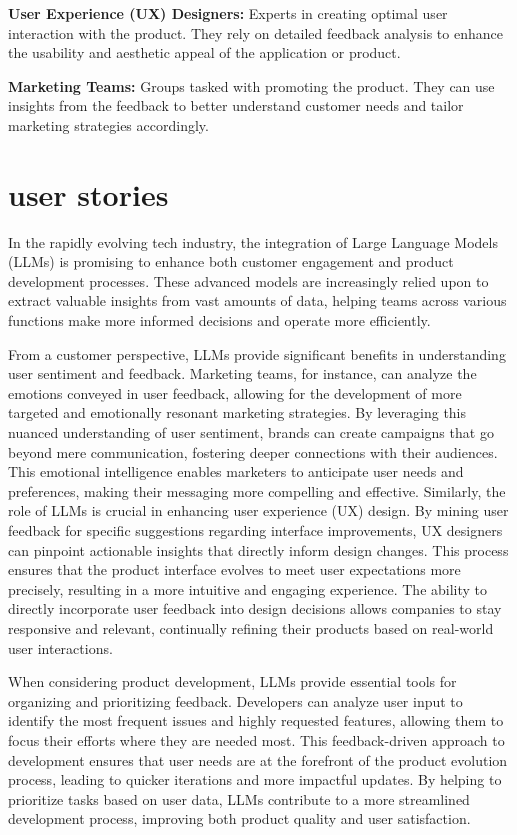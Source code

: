 \documentclass[journal,transmag]{IEEEtran}
\begin{document}
\textbf{User Experience (UX) Designers:} Experts in creating optimal user interaction with the product. They rely on detailed feedback analysis to enhance the usability and aesthetic appeal of the application or product.

\textbf{Marketing Teams:} Groups tasked with promoting the product. They can use insights from the feedback to better understand customer needs and tailor marketing strategies accordingly.



\section{user stories}
In the rapidly evolving tech industry, the integration of Large Language Models (LLMs) is promising to enhance both customer engagement and product development processes. These advanced models are increasingly relied upon to extract valuable insights from vast amounts of data, helping teams across various functions make more informed decisions and operate more efficiently.

From a customer perspective, LLMs provide significant benefits in understanding user sentiment and feedback. Marketing teams, for instance, can analyze the emotions conveyed in user feedback, allowing for the development of more targeted and emotionally resonant marketing strategies. By leveraging this nuanced understanding of user sentiment, brands can create campaigns that go beyond mere communication, fostering deeper connections with their audiences. This emotional intelligence enables marketers to anticipate user needs and preferences, making their messaging more compelling and effective. Similarly, the role of LLMs is crucial in enhancing user experience (UX) design. By mining user feedback for specific suggestions regarding interface improvements, UX designers can pinpoint actionable insights that directly inform design changes. This process ensures that the product interface evolves to meet user expectations more precisely, resulting in a more intuitive and engaging experience. The ability to directly incorporate user feedback into design decisions allows companies to stay responsive and relevant, continually refining their products based on real-world user interactions.

When considering product development, LLMs provide essential tools for organizing and prioritizing feedback. Developers can analyze user input to identify the most frequent issues and highly requested features, allowing them to focus their efforts where they are needed most. This feedback-driven approach to development ensures that user needs are at the forefront of the product evolution process, leading to quicker iterations and more impactful updates. By helping to prioritize tasks based on user data, LLMs contribute to a more streamlined development process, improving both product quality and user satisfaction.
\end{document}
